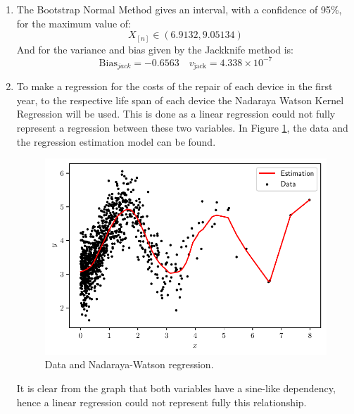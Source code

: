 \documentclass[fleqn]{article}
\begin{document}
\begin{enumerate}[label=\alph*)]
  \item The Bootstrap Normal Method gives an interval, with a confidence of
  95\%, for the maximum value of:
    \[
    X_{[n]} \in (6.9132, 9.05134)
    \]
    And for the variance and bias given by the Jackknife method is:
    \[
    \mathrm{Bias}_{jack} = -0.6563 \quad v_{\mathrm{jack}} = 4.338 \times 10^{-7}
    \]

  \item To make a regression for the costs of the repair of each device in the
    first year, to the respective life span of each device the Nadaraya Watson
    Kernel Regression will be used. This is done as a linear regression could
    not fully represent a regression between these two variables. In Figure
    \ref{fig:nwr}, the data and the regression estimation model can be found.
    \begin{figure}[H]
      \centering
      \includegraphics[scale=.5]{../figs/scatter-vs-model}
      \caption{Data and Nadaraya-Watson regression.}
      \label{fig:nwr}
    \end{figure}

    It is clear from the graph that both variables have a sine-like dependency,
    hence a linear regression could not represent fully this relationship.


\end{enumerate}
\end{document}
